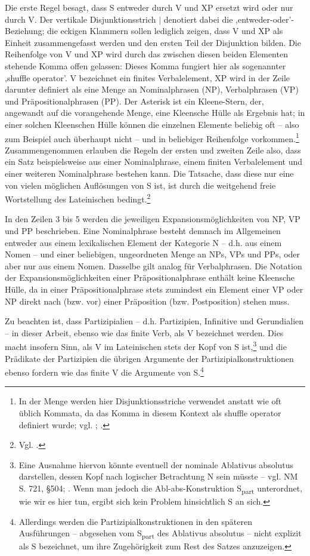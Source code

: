 \documentclass[12pt,a4paper]{article}
\begin{document}
Die erste Regel besagt, dass S entweder durch V und XP ersetzt wird oder nur durch V. Der vertikale Disjunktionsstrich $\mid$ denotiert dabei die ,entweder-oder'-Beziehung; die eckigen Klammern sollen lediglich zeigen, dass V und XP als Einheit zusammengefasst werden und den ersten Teil der Disjunktion bilden. Die Reihenfolge von V und XP wird durch das zwischen diesen beiden Elementen stehende Komma offen gelassen: Dieses Komma fungiert hier als sogenannter ,shuffle operator'. V bezeichnet ein finites Verbalelement, XP wird in der Zeile darunter definiert als eine Menge an Nominalphrasen (NP), Verbalphrasen (VP) und Präpositionalphrasen (PP). Der Asterisk ist ein Kleene-Stern, der, angewandt auf die vorangehende Menge, eine Kleensche Hülle als Ergebnis hat; in einer solchen Kleenschen Hülle können die einzelnen Elemente beliebig oft -- also zum Beispiel auch überhaupt nicht -- und in beliebiger Reihenfolge vorkommen.\footnote{In der Menge werden hier Disjunktionsstriche verwendet anstatt wie oft üblich Kommata, da das Komma in diesem Kontext als shuffle operator definiert wurde; vgl. \cite[26]{Skript}; \cite{Snijders}.} Zusammengenommen erlauben die Regeln der ersten und zweiten Zeile also, dass ein Satz beispielsweise aus einer Nominalphrase, einem finiten Verbalelement und einer weiteren Nominalphrase bestehen kann. Die Tatsache, dass diese nur eine von vielen möglichen Auflösungen von S ist, ist durch die weitgehend freie Wortstellung des Lateinischen bedingt.\footnote{Vgl. \cite[19]{Rohrer}.}

In den Zeilen 3 bis 5 werden die jeweiligen Expansionsmöglichkeiten von NP, VP und PP beschrieben. Eine Nominalphrase besteht demnach im Allgemeinen entweder aus einem lexikalischen Element der Kategorie N – d.h. aus einem Nomen -- und einer beliebigen, ungeordneten Menge an NPs, VPs und PPs, oder aber nur aus einem Nomen. Dasselbe gilt analog für Verbalphrasen. Die Notation der Expansionsmöglichkeiten einer Präpositionalphrase enthält keine Kleensche Hülle, da in einer Präpositionalphrase stets zumindest ein Element einer VP oder NP direkt nach (bzw. vor) einer Präposition (bzw. Postposition) stehen muss.

Zu beachten ist, dass Partizipialien – d.h. Partizipien, Infinitive und Gerundialien -- in dieser Arbeit, ebenso wie das finite Verb, als V bezeichnet werden. Dies macht insofern Sinn, als V im Lateinischen stets der Kopf von S ist,\footnote{Eine Ausnahme hiervon könnte eventuell der nominale Ablativus absolutus darstellen, dessen Kopf nach logischer Betrachtung N sein müsste -- vgl. NM S. 721, §504; \cite[64]{Falk}. Wenn man jedoch die Abl-abs-Konstruktion S\textsubscript{part} unterordnet, wie wir es hier tun, ergibt sich kein Problem hinsichtlich S an sich.} und die Prädikate der Partizipien die übrigen Argumente der Partizipialkonstruktionen ebenso fordern wie das finite V die Argumente von S.\footnote{Allerdings werden die Partizipialkonstruktionen in den späteren Ausführungen -- abgesehen vom S\textsubscript{part} des Ablativus absolutus -- nicht explizit als S bezeichnet, um ihre Zugehörigkeit zum Rest des Satzes anzuzeigen.}
\end{document}
